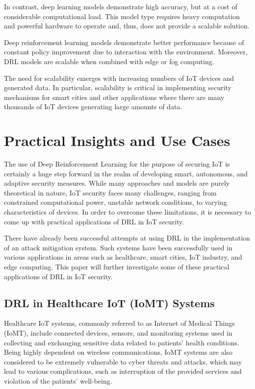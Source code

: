 \documentclass[12pt]{article}
\begin{document}
In contrast, deep learning models demonstrate high accuracy, but at a cost of considerable computational load. This model type requires heavy computation and powerful hardware to operate and, thus, does not provide a scalable solution.

Deep reinforcement learning models demonstrate better performance because of constant policy improvement due to interaction with the environment. Moreover, DRL models are scalable when combined with edge or fog computing.

The need for scalability emerges with increasing numbers of IoT devices and generated data. In particular, scalability is critical in implementing security mechanisms for smart cities and other applications where there are many thousands of IoT devices generating large amounts of data.
	

	\section{Practical Insights and Use Cases}
	The use of Deep Reinforcement Learning for the purpose of securing IoT is certainly a huge step forward in the realm of developing smart, autonomous, and adaptive security measures. While many approaches and models are purely theoretical in nature, IoT security faces many challenges, ranging from constrained computational power, unstable network conditions, to varying characteristics of devices. In order to overcome these limitations, it is necessary to come up with practical applications of DRL in IoT security.

There have already been successful attempts at using DRL in the implementation of an attack mitigation system. Such systems have been successfully used in various applications in areas such as healthcare, smart cities, IoT industry, and edge computing. This paper will further investigate some of these practical applications of DRL in IoT security.
\subsection{DRL in Healthcare IoT (IoMT) Systems}
Healthcare IoT systems, commonly referred to as Internet of Medical Things (IoMT), include connected devices, sensors, and monitoring systems used in collecting and exchanging sensitive data related to patients' health conditions. Being highly dependent on wireless communications, IoMT systems are also considered to be extremely vulnerable to cyber threats and attacks, which may lead to various complications, such as interruption of the provided services and violation of the patients' well-being.
\end{document}
